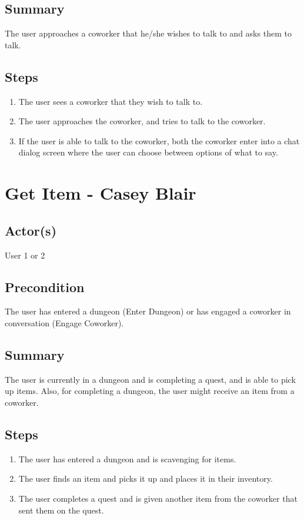 \documentclass[11pt]{article}
\begin{document}
	
		\subsection{Summary}
			The user approaches a coworker that he/she wishes to talk to and asks them to talk.
			\subsection{Steps}
			\begin{enumerate}
			\item The user sees a coworker that they wish to talk to.
			\item The user approaches the coworker, and tries to talk to the coworker. 
			\item If the user is able to talk to the coworker, both the coworker enter into a chat dialog screen where the user can choose between options of what to say. 
			
			\end{enumerate}



\section{Get Item - Casey Blair}
	

		\subsection{Actor(s)}
			User 1 or 2
			

		\subsection{Precondition}
				The user has entered a dungeon (Enter Dungeon) or has engaged a coworker in conversation (Engage Coworker).
			
	
		\subsection{Summary}
				The user is currently in a dungeon and is completing a quest, and is able to pick up items. Also, for completing a dungeon, the user might receive an item from a coworker.
			\subsection{Steps}
			\begin{enumerate}
			\item The user has entered a dungeon and is scavenging for items.
			\item The user finds an item and picks it up and places it in their inventory.
			\item The user completes a quest and is given another item from the coworker that sent them on the quest.
			
			\end{enumerate}
\end{document}
